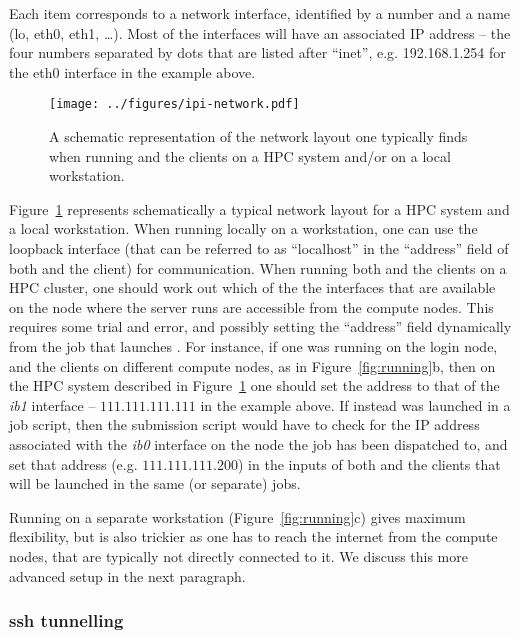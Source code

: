 \documentclass[11pt,english,fleqn]{report}
\begin{document}
Each item corresponds to a network interface, identified by a number and a name (lo, eth0, eth1, \ldots).
Most of the interfaces will have an associated IP address -- the four numbers separated by dots
that are listed after ``inet'', e.g. 192.168.1.254 for the eth0 interface in the example above.

\begin{figure}[hbt]
\centering\texttt{[image: ../figures/ipi-network.pdf]}
\caption{\label{fig:network} A schematic representation of the network layout one
typically finds when running \ipi and the clients on a HPC system and/or on a local workstation. }
\end{figure}

Figure~\ref{fig:network} represents schematically a typical network layout
for a HPC system and a local workstation. When running \ipi locally on a
workstation, one can use the loopback interface (that can be referred to as
``localhost'' in the ``address'' field of both \ipi and the client) for communication.
When running both \ipi and the clients on a HPC cluster, one should work out which of the
the interfaces that are available on the node where the \ipi server runs are accessible from the
compute nodes. This requires some trial and error, and possibly setting the
 ``address'' field dynamically from the job that launches \ipi.
 For instance,
if one was running \ipi on the login node, and the clients on different compute nodes, as
in Figure~\ref{fig:running}b, then on the HPC system described in Figure~\ref{fig:network}
one should set the address to that of the \emph{ib1} interface -- $111.111.111.111$ in
the example above. If instead \ipi was launched in a job script, then the submission script would
have to check for the IP address associated with the \emph{ib0} interface on the node
the job has been dispatched to, and set that address (e.g. $111.111.111.200$) in the inputs
of both \ipi and the clients that will be launched in the same (or separate) jobs.

Running \ipi on a separate workstation (Figure~\ref{fig:running}c) gives
maximum flexibility, but is also trickier as one has to reach the
internet from the compute nodes, that are typically not directly connected to it.
We discuss this more advanced setup in the next paragraph.

\subsubsection{ssh tunnelling}
\end{document}
